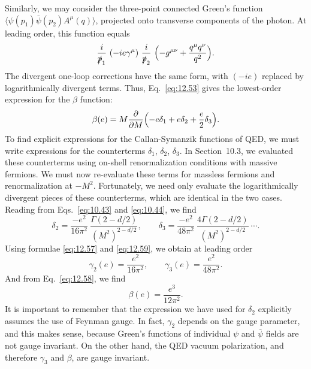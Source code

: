 Similarly, we may consider the three-point connected Green's function
$\langle\psi(p_1)\bar{\psi}(p_2)A^\mu(q)\rangle$, projected onto transverse
components of the photon.  At leading order, this function equals
\begin{equation}
  \frac{i}{\slashed{p}_1}\ (-ie\gamma^\mu)\ \frac{i}{\slashed{p}_2}\
  \Bigl( -g^{\mu\nu} + \frac{q^\mu q^\nu}{q^2} \Bigr) .
\end{equation}
The divergent one-loop corrections have the same form, with $(-ie)$ replaced
by logarithmically divergent terms.  Thus, Eq.~\eqref{eq:12.53} gives the
lowest-order expression for the $\beta$ function:
\begin{equation}
  \beta(e) = M\frac{\partial}{\partial M}\Bigl( -e\delta_1 + e\delta_2
    + \frac{e}{2}\delta_3 \Bigr) .
  \label{eq:12.58}
\end{equation}
To find explicit expressions for the Callan-Symanzik functions of QED, we
must write expressions for the counterterms $\delta_1$, $\delta_2$, $\delta_3$.
In Section~10.3, we evaluated these counterterms using on-shell
renormalization conditions with massive fermions.  We must now re-evaluate
these terms for massless fermions and renormalization at $-M^2$.
Fortunately, we need only evaluate the logarithmically divergent pieces of
these counterterms, which are identical in the two cases.  Reading from
Eqs.~\eqref{eq:10.43} and \eqref{eq:10.44}, we find
\begin{equation}
  \delta_2 = \frac{-e^2}{16\pi^2}\ \frac{\Gamma(2-d/2)}{(M^2)^{2-d/2}},\qquad
  \delta_3 = \frac{-e^2}{48\pi^2}\ \frac{4\Gamma(2-d/2)}{(M^2)^{2-d/2}}
  \ \cdots .
  \label{eq:12.59}
\end{equation}
Using formulae \eqref{eq:12.57} and \eqref{eq:12.59}, we obtain at leading
order
\begin{equation}
  \gamma_2(e) = \frac{e^2}{16\pi^2},\qquad
  \gamma_3(e) = \frac{e^2}{48\pi^2} .
  \label{eq:12.60}
\end{equation}
And from Eq.~\eqref{eq:12.58}, we find
\begin{equation}
  \beta(e) = \frac{e^3}{12\pi^2} .
  \label{eq:12.61}
\end{equation}
It is important to remember that the expression we have used for $\delta_2$
explicitly assumes the use of Feynman gauge.  In fact, $\gamma_2$ depends on
the gauge parameter, and this makes sense, because Green's functions of
individual $\psi$ and $\bar{\psi}$ fields are not gauge invariant.  On the
other hand, the QED vacuum polarization, and therefore $\gamma_3$ and
$\beta$, are gauge invariant.

